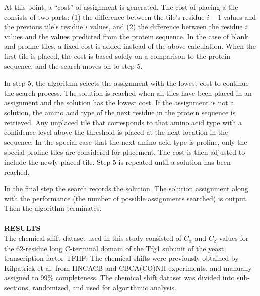 \documentclass{article}
\begin{document}
\indent At this point, a “cost” of assignment is generated. The cost of placing a tile consists of two parts: (1) the difference between the tile's residue $i-1$ values and the previous tile's residue $i$ values, and (2) the difference between the residue $i$ values and the values predicted from the protein sequence. In the case of blank and proline tiles, a fixed cost is added instead of  the above calculation. When the first tile is placed, the cost is based solely on a comparison to the protein sequence, and the search moves on to step 5.

\indent In step 5, the algorithm selects the assignment with the lowest cost to continue the search process. The solution is reached when all tiles have been placed in an assignment and the solution has the lowest cost. If the assignment is not a solution, the amino acid type of the next residue in the protein sequence is retrieved. Any unplaced tile that corresponds to that amino acid type with a confidence level above the threshold is placed at the next location in the sequence. In the special case that the next amino acid type is proline, only the special proline tiles are considered for placement. The cost is then adjusted to include the newly placed tile. Step 5 is repeated until a solution has been reached. 

\indent In the final step the search records the solution. The solution assignment along with the performance (the number of possible assignments searched) is output. Then the algorithm terminates. 
\\\\
\noindent\textbf{RESULTS}\\
\indent The chemical shift dataset used in this study consisted of $C_{\alpha}$ and $C_{\beta}$ values for the 62-residue long C-terminal domain of the Tfg1 subunit of the yeast transcription factor TFIIF. The chemical shifts were previously obtained by Kilpatrick et al. from HNCACB and CBCA(CO)NH experiments, and manually assigned to 99\% completeness\cite{kilpatrick}. The chemical shift dataset was divided into sub-sections, randomized, and used for algorithmic analysis. 
\end{document}
